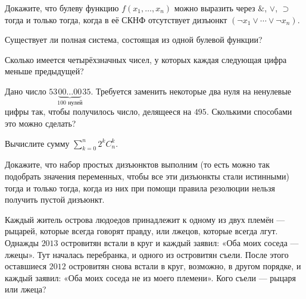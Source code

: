 \begin{problems}
\item Докажите, что булеву функцию $f(x_1,\ldots,x_n)$ можно выразить через $\mathbin{\&}$, $\vee$, $\supset$ тогда и только тогда, когда в её СКНФ отсутствует дизъюнкт $(\neg x_1\vee\cdots\vee\neg x_n)$.

\item Существует ли полная система, состоящая из одной булевой функции?

\item Сколько имеется четырёхзначных чисел, у которых каждая следующая цифра меньше предыдущей?

\item Дано число $53\underbrace{00\ldots00}_{100\text{ нулей}}35$. Требуется заменить некоторые два нуля на ненулевые цифры так, чтобы получилось число, делящееся на $495$. Сколькими способами это можно сделать?

\item Вычислите сумму $\displaystyle\sum_{k=0}^{n} 2^k C_n^k$.

\item Докажите, что набор простых дизъюнктов выполним (то есть можно так подобрать значения переменных, чтобы все эти дизъюнкты стали истинными) тогда и только тогда, когда из них при помощи правила резолюции нельзя получить пустой дизъюнкт.

\item Каждый житель острова людоедов принадлежит к одному из двух племён --- рыцарей, которые всегда говорят правду, или лжецов, которые всегда лгут. Однажды $2013$ островитян встали в круг и каждый заявил: «Оба моих соседа --- лжецы». Тут началась перебранка, и одного из островитян съели. После этого оставшиеся $2012$ островитян снова встали в круг, возможно, в другом порядке, и каждый заявил: «Оба моих соседа не из моего племени». Кого съели --- рыцаря или лжеца?

\end{problems}

